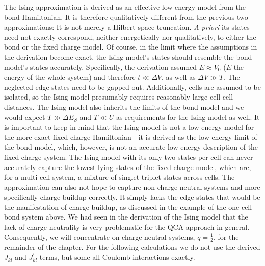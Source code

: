 The Ising approximation is derived as an effective low-energy model from the
bond Hamiltonian. It is therefore qualitatively different from the previous two
approximations: It is not merely a Hilbert space truncation. \emph{A priori}
its states need not exactly correspond, neither energetically nor qualitatively, to either the bond or the fixed charge
model. Of course, in the limit where the assumptions in the derivation become
exact, the Ising model's states should resemble the bond model's states
accurately. Specifically, the derivation assumed $E \approx V_0$ ($E$ the energy
of the whole system) and therefore $t \ll \Delta V$, as well as $\Delta V \gg
T$. The neglected edge states need to be gapped out. Additionally, cells are
assumed to be isolated, so the Ising model presumably requires reasonably large
cell-cell distances. The Ising model also inherits the limits of the bond model and we
would expect $T \gg \Delta E_S$ and $T \ll U$ as requirements for the Ising
model as well. It is important to keep in mind that the Ising model is not a low-energy
model for the more exact fixed charge Hamiltonian---it is derived as the
low-energy limit of the bond model, which, however, is not an accurate
low-energy description of the fixed charge system. The Ising model with its only
two states per cell can never accurately capture the lowest lying states of the
fixed charge model, which are, for a multi-cell system, a mixture of
singlet-triplet states across cells. The approximation can also not hope to
capture non-charge neutral systems and more specifically charge buildup
correctly. It simply lacks the edge states that would be the manifestation of
charge buildup, as discussed in the example of the one-cell bond system above.
We had seen in the derivation of the Ising model that the lack of
charge-neutrality is very problematic for the QCA approach in general.
Consequently, we will concentrate on charge neutral systems, $q = \frac{1}{2}$,
for the remainder of the chapter. For the following calculations we do not use
the derived $J_{kl}$ and $J^{\prime}_{kl}$ terms, but some all Coulomb
interactions exactly.

